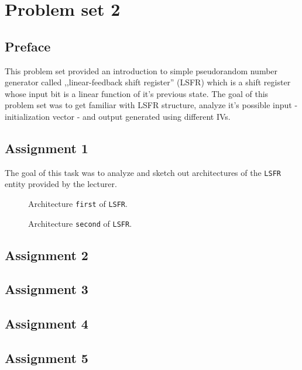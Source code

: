 \section{Problem set 2}
\subsection{Preface}
This problem set provided an introduction to simple pseudorandom number
generator called ,,linear-feedback shift register'' (LSFR) which is a shift
register whose input bit is a linear function of it's previous state. The goal
of this problem set was to get familiar with LSFR structure, analyze it's possible
input - initialization vector - and output generated using different IVs.

\subsection{Assignment 1}
The goal of this task was to analyze and sketch out architectures of the
\texttt{LSFR} entity provided by the lecturer.

\begin{figure}[!htb]
  \caption{\label{fig:assignment1-lsfr_first} Architecture \texttt{first} of \texttt{LSFR}.}
\end{figure}

\begin{figure}[!htb]
  \caption{\label{fig:assignment1--lsfr_second} Architecture \texttt{second} of \texttt{LSFR}.}
\end{figure}


\subsection{Assignment 2}
\subsection{Assignment 3}
\subsection{Assignment 4}
\subsection{Assignment 5}